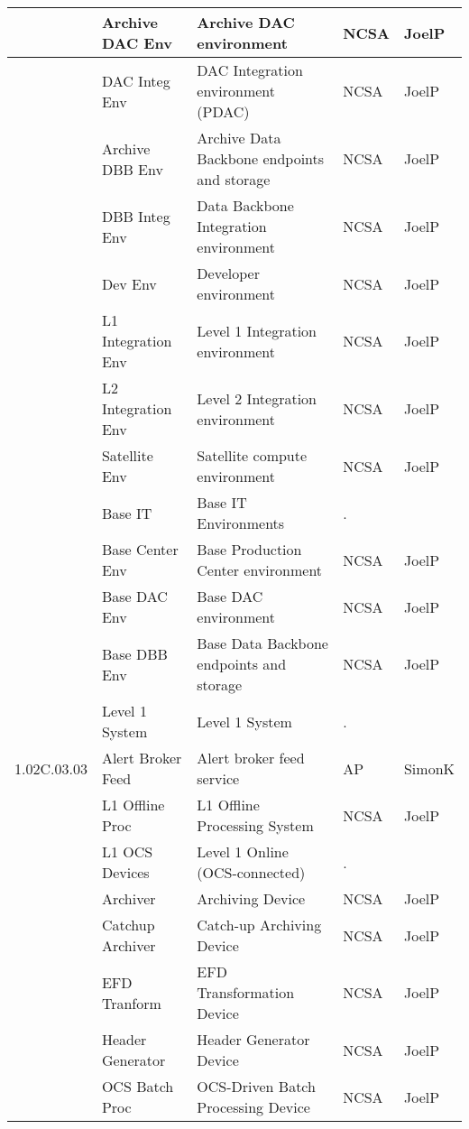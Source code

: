 \begin{longtable}{|p{}|p{}|p{}|p{}|p{}|}
{\tiny } & \small Archive DAC Env & Archive DAC environment & NCSA & JoelP\\ \hline 
{\tiny } & \small DAC Integ Env & DAC Integration environment (PDAC) & NCSA & JoelP\\ \hline 
{\tiny } & \small Archive DBB Env & Archive Data Backbone endpoints and storage & NCSA & JoelP\\ \hline 
{\tiny } & \small DBB Integ Env & Data Backbone Integration environment & NCSA & JoelP\\ \hline 
{\tiny } & \small Dev Env & Developer environment & NCSA & JoelP\\ \hline 
{\tiny } & \small L1 Integration Env & Level 1 Integration environment & NCSA & JoelP\\ \hline 
{\tiny } & \small L2 Integration Env & Level 2 Integration environment & NCSA & JoelP\\ \hline 
{\tiny } & \small Satellite Env & Satellite compute environment & NCSA & JoelP\\ \hline 
{\tiny } & \small Base IT & Base IT Environments & . & \\ \hline 
{\tiny } & \small Base Center Env & Base Production Center environment & NCSA & JoelP\\ \hline 
{\tiny } & \small Base DAC Env & Base DAC environment & NCSA & JoelP\\ \hline 
{\tiny } & \small Base DBB Env & Base Data Backbone endpoints and storage & NCSA & JoelP\\ \hline 
{\tiny } & \small Level 1 System & Level 1 System & . & \\ \hline 
{\tiny 1.02C.03.03} & \small Alert Broker Feed & Alert broker feed service & AP & SimonK\\ \hline 
{\tiny } & \small L1 Offline Proc & L1 Offline Processing System & NCSA & JoelP\\ \hline 
{\tiny } & \small L1 OCS Devices & Level 1 Online (OCS-connected) & . & \\ \hline 
{\tiny } & \small Archiver & Archiving Device & NCSA & JoelP\\ \hline 
{\tiny } & \small Catchup Archiver & Catch-up Archiving Device & NCSA & JoelP\\ \hline 
{\tiny } & \small EFD Tranform & EFD Transformation Device & NCSA & JoelP\\ \hline 
{\tiny } & \small Header Generator & Header Generator Device & NCSA & JoelP\\ \hline 
{\tiny } & \small OCS Batch Proc & OCS-Driven Batch Processing Device & NCSA & JoelP\\ \hline 

\end{longtable}
